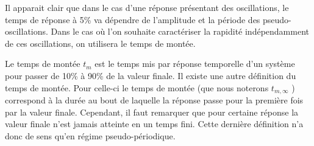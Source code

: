 Il apparait clair que dans le cas d'une réponse présentant des oscillations,
le temps de réponse à 5\% va dépendre de l'amplitude et la période des 
pseudo-oscillations. Dans le cas où l'on souhaite caractériser la rapidité
indépendamment de ces oscillations, on utilisera le temps de montée.

Le temps de montée $t_m$ est le temps mis par réponse temporelle d'un système 
pour passer de 10\% à 90\% de la valeur finale. Il existe une autre 
définition du temps de montée. Pour celle-ci le temps de montée (que nous 
noterons $t_{m,\infty}$ ) correspond à la durée au bout de laquelle la 
réponse passe pour la première fois par la valeur finale. Cependant, 
il faut remarquer que pour certaine réponse la valeur finale n'est 
jamais atteinte en un temps fini. Cette dernière définition
n'a donc de sens qu'en régime pseudo-périodique.

